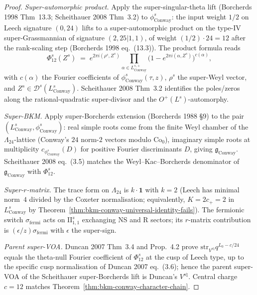 \begin{proof}
\emph{Super-automorphic product.} Apply the super-singular-theta lift
(Borcherds 1998 Thm~13.3; Scheithauer 2008 Thm~3.2) to
$\phi^{s}_{\mathrm{Conway}}$: the input weight $1/2$ on Leech
signature $(0,24)$ lifts to a super-automorphic product on the
type-IV super-Grassmannian of signature $(2,25|1,1)$, of weight
$(1/2)\cdot 24 = 12$ after the rank-scaling step (Borcherds 1998
eq.~(13.3)). The product formula reads
\[
 \Phi^{s}_{12}(Z^{s})
 \;=\;e^{2\pi i(\rho^{s},Z^{s})}
 \prod_{\alpha\in L^{s,+}_{\mathrm{Conway}}}
 \bigl(1-e^{2\pi i(\alpha,Z^{s})}\bigr)^{c(\alpha)},
\]
with $c(\alpha)$ the Fourier coefficients of
$\phi^{s}_{\mathrm{Conway}}(\tau,z)$, $\rho^{s}$ the super-Weyl
vector, and $Z^{s}\in\mathcal D^{s}(L^{s}_{\mathrm{Conway}})$.
Scheithauer 2008 Thm~3.2 identifies the poles/zeros along the
rational-quadratic super-divisor and the $O^{+}(L^{s})$-automorphy.

\emph{Super-BKM.} Apply super-Borcherds extension (Borcherds 1988
\S9) to the pair $(L^{s}_{\mathrm{Conway}},\phi^{s}_{\mathrm{Conway}})$:
real simple roots come from the finite Weyl chamber of the
$\Lambda_{24}$-lattice (Conway's $24$ norm-$2$ vectors modulo
$\mathrm{Co}_{0}$), imaginary simple roots at multiplicity
$c_{\phi^{s}_{\mathrm{Conway}}}(D)$ for positive Fourier discriminants
$D$, giving $\mathfrak g_{\mathrm{Conway}}$. Scheithauer 2008 eq.~(3.5)
matches the Weyl--Kac--Borcherds denominator of
$\mathfrak g_{\mathrm{Conway}}$ with $\Phi^{s}_{12}$.

\emph{Super-$r$-matrix.} The trace form on $\Lambda_{24}$ is
$k\cdot\mathbf 1$ with $k = 2$ (Leech has minimal norm~$4$ divided
by the Coxeter normalisation; equivalently, $K = 2c_{+} = 2$ in
$L^{s}_{\mathrm{Conway}}$ by Theorem~\ref{thm:bkm-conway-universal-identity-fails}).
The fermionic switch $\sigma_{\mathrm{fermi}}$ acts on
$\mathrm{II}_{1,1}^{s}$ exchanging NS and R sectors; its
$r$-matrix contribution is $(\epsilon/z)\sigma_{\mathrm{fermi}}$
with $\epsilon$ the super-sign.

\emph{Parent super-VOA.} Duncan 2007 Thm~3.4 and Prop.~4.2 prove
$\mathrm{str}_{V^{s\natural}}q^{L_{0}-c/24}$ equals the theta-null
Fourier coefficient of $\Phi^{s}_{12}$ at the cusp of Leech type,
up to the specific cusp normalisation of Duncan 2007 eq.~(3.6);
hence the parent super-VOA of the Scheithauer super-Borcherds lift
is Duncan's $V^{s\natural}$. Central charge $c = 12$ matches
Theorem~\ref{thm:bkm-conway-character-chain}.


\end{proof}

